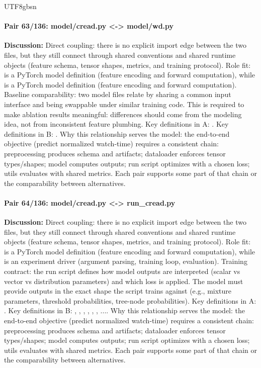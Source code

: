\documentclass[11pt]{article}
\begin{document}
\begin{CJK*}{UTF8}{gbsn}
\paragraph{Pair 63/136: model/cread.py <-> model/wd.py}
\textbf{Discussion:} Direct coupling: there is no explicit import edge between the two files, but they still connect through shared conventions and shared runtime objects (feature schema, tensor shapes, metrics, and training protocol). Role fit: \texttt{} is a PyTorch model definition (feature encoding and forward computation), while \texttt{} is a PyTorch model definition (feature encoding and forward computation). Baseline comparability: two model files relate by sharing a common input interface and being swappable under similar training code. This is required to make ablation results meaningful: differences should come from the modeling idea, not from inconsistent feature plumbing. Key definitions in A: \texttt{}. Key definitions in B: \texttt{}. Why this relationship serves the model: the end-to-end objective (predict normalized watch-time) requires a consistent chain: preprocessing produces schema and artifacts; dataloader enforces tensor types/shapes; model computes outputs; run script optimizes with a chosen loss; utils evaluates with shared metrics. Each pair supports some part of that chain or the comparability between alternatives.

\paragraph{Pair 64/136: model/cread.py <-> run\_cread.py}
\textbf{Discussion:} Direct coupling: there is no explicit import edge between the two files, but they still connect through shared conventions and shared runtime objects (feature schema, tensor shapes, metrics, and training protocol). Role fit: \texttt{} is a PyTorch model definition (feature encoding and forward computation), while \texttt{} is an experiment driver (argument parsing, training loop, evaluation). Training contract: the run script defines how model outputs are interpreted (scalar vs vector vs distribution parameters) and which loss is applied. The model must provide outputs in the exact shape the script trains against (e.g., mixture parameters, threshold probabilities, tree-node probabilities). Key definitions in A: \texttt{}. Key definitions in B: \texttt{}, \texttt{}, \texttt{}, \texttt{}, \texttt{}, \texttt{}, .... Why this relationship serves the model: the end-to-end objective (predict normalized watch-time) requires a consistent chain: preprocessing produces schema and artifacts; dataloader enforces tensor types/shapes; model computes outputs; run script optimizes with a chosen loss; utils evaluates with shared metrics. Each pair supports some part of that chain or the comparability between alternatives.


\end{CJK*}
\end{document}
